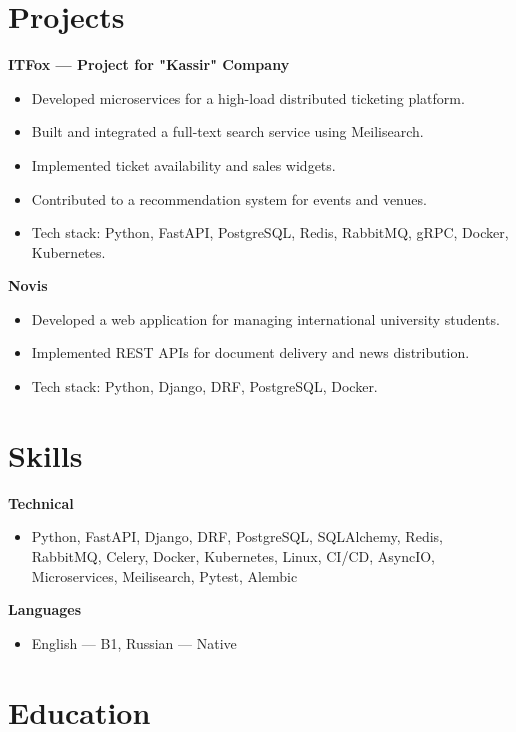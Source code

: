 \documentclass{clean_cv}
\begin{document}
\section{Projects}

\textbf{ITFox — Project for "Kassir" Company}
\begin{itemize}
    \item Developed microservices for a high-load distributed ticketing platform.
    \item Built and integrated a full-text search service using Meilisearch.
    \item Implemented ticket availability and sales widgets.
    \item Contributed to a recommendation system for events and venues.
    \item Tech stack: Python, FastAPI, PostgreSQL, Redis, RabbitMQ, gRPC, Docker, Kubernetes.
\end{itemize}

\textbf{Novis}
\begin{itemize}
    \item Developed a web application for managing international university students.
    \item Implemented REST APIs for document delivery and news distribution.
    \item Tech stack: Python, Django, DRF, PostgreSQL, Docker.
\end{itemize}

\section{Skills}

\textbf{Technical}
\begin{itemize}
    \item Python, FastAPI, Django, DRF, PostgreSQL, SQLAlchemy, Redis, RabbitMQ, Celery, Docker, Kubernetes, Linux, CI/CD, AsyncIO, Microservices, Meilisearch, Pytest, Alembic
\end{itemize}

\textbf{Languages}
\begin{itemize}
    \item English — B1, Russian — Native
\end{itemize}

\section{Education}
\end{document}
